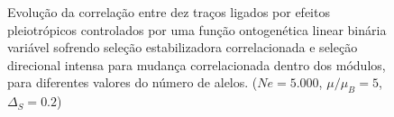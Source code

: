 \begin{figure}[htbp]
  \centering
  \vspace{11pt}
  \vspace{-18pt}
  \vspace{11pt}
  \caption{Evolução da correlação entre dez traços ligados por efeitos
  pleiotrópicos controlados por uma função ontogenética linear binária
  variável sofrendo seleção estabilizadora correlacionada e seleção
  direcional intensa para mudança correlacionada dentro dos módulos,
  para diferentes valores do número de alelos. ($Ne=5.000$, $\mu/\mu_B=5$, $\Delta_S=0.2$)}
  \label{MBLR}
\end{figure}
